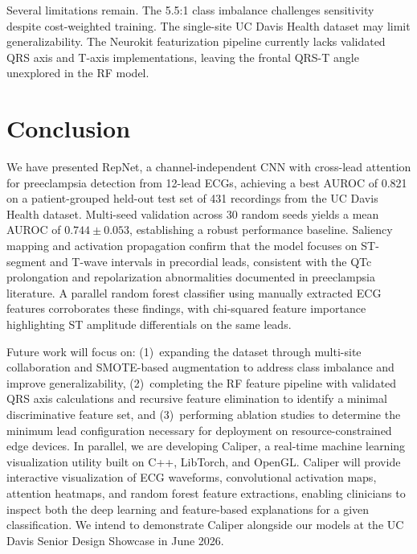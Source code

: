 \documentclass[sigconf,nonacm]{acmart}
\begin{document}
Several limitations remain. The 5.5:1 class imbalance challenges sensitivity despite cost-weighted training. The single-site UC Davis Health dataset may limit generalizability. The Neurokit featurization pipeline currently lacks validated QRS axis and T-axis implementations, leaving the frontal QRS-T angle unexplored in the RF model.

\section{Conclusion}

We have presented RepNet, a channel-independent CNN with cross-lead attention for preeclampsia detection from 12-lead ECGs, achieving a best AUROC of 0.821 on a patient-grouped held-out test set of 431 recordings from the UC Davis Health dataset. Multi-seed validation across 30 random seeds yields a mean AUROC of $0.744 \pm 0.053$, establishing a robust performance baseline. Saliency mapping and activation propagation confirm that the model focuses on ST-segment and T-wave intervals in precordial leads, consistent with the QTc prolongation and repolarization abnormalities documented in preeclampsia literature. A parallel random forest classifier using manually extracted ECG features corroborates these findings, with chi-squared feature importance highlighting ST amplitude differentials on the same leads.

Future work will focus on: (1)~expanding the dataset through multi-site collaboration and SMOTE-based augmentation to address class imbalance and improve generalizability, (2)~completing the RF feature pipeline with validated QRS axis calculations and recursive feature elimination to identify a minimal discriminative feature set, and (3)~performing ablation studies to determine the minimum lead configuration necessary for deployment on resource-constrained edge devices. In parallel, we are developing Caliper, a real-time machine learning visualization utility built on C++, LibTorch, and OpenGL. Caliper will provide interactive visualization of ECG waveforms, convolutional activation maps, attention heatmaps, and random forest feature extractions, enabling clinicians to inspect both the deep learning and feature-based explanations for a given classification. We intend to demonstrate Caliper alongside our models at the UC Davis Senior Design Showcase in June 2026.



\end{document}
